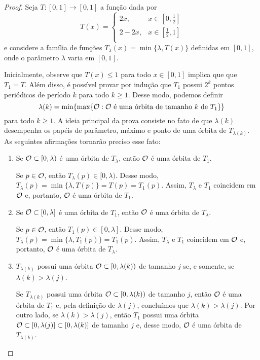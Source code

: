 \begin{proof}
Seja $T: [0,1] \to [0,1]$ a função dada por
\[ T(x) =
  \begin{cases}
    2x, & x \in \left[ 0, \frac{1}{2} \right] \\
    2 - 2x, & x \in \left[ \frac{1}{2}, 1 \right] \\
  \end{cases}
\]
e considere a família de funções $T_\lambda(x) = \min \lbrace \lambda, T(x) \rbrace$ definidas em $[0,1]$, onde o parâmetro $\lambda$ varia em $[0,1]$.

Inicialmente, observe que $T(x) \leq 1$ para todo $x \in [0,1]$ implica que que $T_1 = T$.
Além disso, é possível provar por indução que $T_1$ possui $2^k$ pontos periódicos de período $k$ para todo $k \geq 1$.
Desse modo, podemos definir
$$\lambda(k) = \min \lbrace \max \lbrace \mathcal{O} : \mathcal{O} \text{ é uma órbita de tamanho } k \text{ de } T_1 \rbrace \rbrace$$
para todo $k \geq 1$.
A ideia principal da prova consiste no fato de que $\lambda(k)$ desempenha os papéis de parâmetro, máximo e ponto de uma órbita de $T_{\lambda(k)}$. As seguintes afirmações tornarão preciso esse fato:

\begin{enumerate}[label=\alph*)]
\item Se $\mathcal{O} \subset [0, \lambda)$ é uma órbita de $T_\lambda$, então $\mathcal{O}$ é uma órbita de $T_1$.

Se $p \in \mathcal{O}$, então $T_\lambda(p) \in [0, \lambda)$.
Desse modo, $T_\lambda(p) = \min \lbrace \lambda, T(p) \rbrace = T(p) = T_1(p)$.
Assim, $T_\lambda$ e $T_1$ coincidem em $\mathcal{O}$ e, portanto, $\mathcal{O}$ é uma órbita de $T_1$.

\item Se $\mathcal{O} \subset [0, \lambda]$ é uma órbita de $T_1$, então $\mathcal{O}$ é uma órbita de $T_\lambda$.

Se $p \in \mathcal{O}$, então $T_1(p) \in [0, \lambda]$. Desse modo, $T_\lambda(p) = \min \lbrace \lambda, T_1(p) \rbrace = T_1(p)$.
Assim, $T_\lambda$ e $T_1$ coincidem em $\mathcal{O}$ e, portanto, $\mathcal{O}$ é uma órbita de $T_\lambda$.

\item $T_{\lambda(k)}$ possui uma órbita $\mathcal{O} \subset [0, \lambda(k))$ de tamanho $j$ se, e somente, se $\lambda(k) > \lambda(j)$.

Se $T_{\lambda(k)}$ possui uma órbita $\mathcal{O} \subset [0, \lambda(k))$ de tamanho $j$, então $\mathcal{O}$ é uma órbita de $T_1$ e, pela definição de $\lambda(j)$, concluímos que $\lambda(k) > \lambda(j)$.
Por outro lado, se $\lambda(k) > \lambda(j)$, então $T_1$ possui uma órbita $\mathcal{O} \subset [0, \lambda(j)] \subset [0, \lambda(k)]$ de tamanho $j$ e, desse modo, $\mathcal{O}$ é uma órbita de $T_{\lambda(k)}$.


\end{enumerate}
\end{proof}
